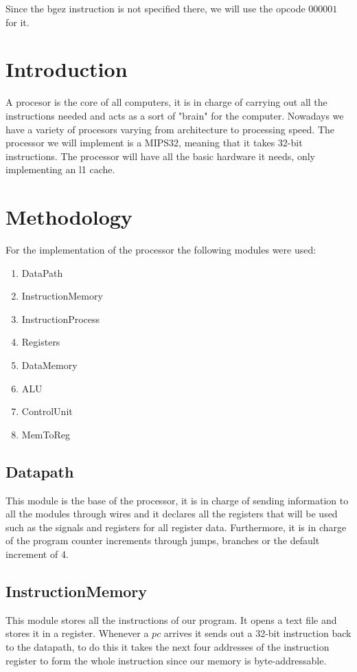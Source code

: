 \documentclass[12pt,a4paper]{article}
\begin{document}
Since the bgez instruction is not specified there, we will use the opcode $000001$ for it.

\section{Introduction}
A procesor is the core of all computers, it is in charge of carrying out all the instructions needed and acts as a sort of "brain" for the computer. Nowadays we have a variety of procesors varying from architecture to processing speed. The processor we will implement is a MIPS32, meaning that it takes 32-bit instructions. The processor will have all the basic hardware it needs, only implementing an l1 cache.



\section{Methodology}
For the implementation of the processor the following modules were used:
\begin{enumerate}
\item DataPath
\item InstructionMemory
\item InstructionProcess
\item Registers
\item DataMemory
\item ALU
\item ControlUnit
\item MemToReg
\end{enumerate}

\subsection{Datapath}
\text This module is the base of the processor, it is in charge of sending information to all the modules through wires and it declares all the registers that will be used such as the signals and registers for all register data. Furthermore, it is in charge of the program counter increments through jumps, branches or the default increment of 4.

\subsection{InstructionMemory}
\text This module stores all the instructions of our program. It opens a text file and stores it in a register. Whenever a $pc$ arrives it sends out a 32-bit instruction back to the datapath, to do this it takes the next four addresses of the instruction register to form the whole instruction since our memory is byte-addressable.
\end{document}
